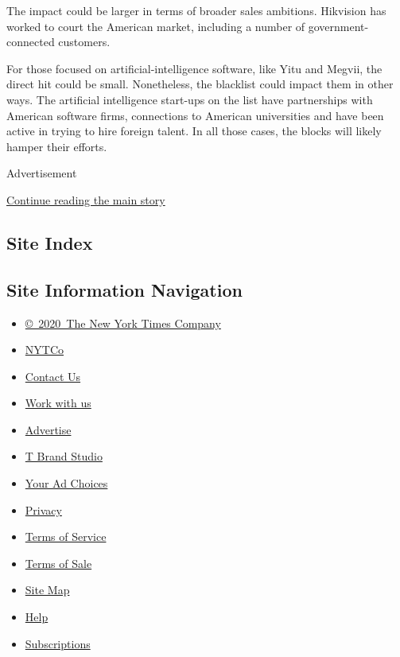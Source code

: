 The impact could be larger in terms of broader sales ambitions.
Hikvision has worked to court the American market, including a number of
government-connected customers.

For those focused on artificial-intelligence software, like Yitu and
Megvii, the direct hit could be small. Nonetheless, the blacklist could
impact them in other ways. The artificial intelligence start-ups on the
list have partnerships with American software firms, connections to
American universities and have been active in trying to hire foreign
talent. In all those cases, the blocks will likely hamper their efforts.

Advertisement

\protect\hyperlink{after-bottom}{Continue reading the main story}

\hypertarget{site-index}{%
\subsection{Site Index}\label{site-index}}

\hypertarget{site-information-navigation}{%
\subsection{Site Information
Navigation}\label{site-information-navigation}}

\begin{itemize}
\tightlist
\item
  \href{https://help.nytimes.com/hc/en-us/articles/115014792127-Copyright-notice}{©~2020~The
  New York Times Company}
\end{itemize}

\begin{itemize}
\tightlist
\item
  \href{https://www.nytco.com/}{NYTCo}
\item
  \href{https://help.nytimes.com/hc/en-us/articles/115015385887-Contact-Us}{Contact
  Us}
\item
  \href{https://www.nytco.com/careers/}{Work with us}
\item
  \href{https://nytmediakit.com/}{Advertise}
\item
  \href{http://www.tbrandstudio.com/}{T Brand Studio}
\item
  \href{https://www.nytimes.com/privacy/cookie-policy\#how-do-i-manage-trackers}{Your
  Ad Choices}
\item
  \href{https://www.nytimes.com/privacy}{Privacy}
\item
  \href{https://help.nytimes.com/hc/en-us/articles/115014893428-Terms-of-service}{Terms
  of Service}
\item
  \href{https://help.nytimes.com/hc/en-us/articles/115014893968-Terms-of-sale}{Terms
  of Sale}
\item
  \href{https://spiderbites.nytimes.com}{Site Map}
\item
  \href{https://help.nytimes.com/hc/en-us}{Help}
\item
  \href{https://www.nytimes.com/subscription?campaignId=37WXW}{Subscriptions}
\end{itemize}
